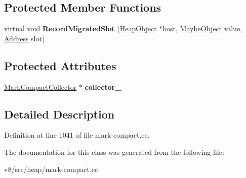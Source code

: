 \subsection*{Protected Member Functions}
\begin{DoxyCompactItemize}
\item 
\mbox{\label{classv8_1_1internal_1_1RecordMigratedSlotVisitor_a143c9723613d76908e2ac3d8e6bc746e}} 
virtual void {\bfseries Record\+Migrated\+Slot} (\mbox{\hyperlink{classv8_1_1internal_1_1HeapObject}{Heap\+Object}} $\ast$host, \mbox{\hyperlink{classv8_1_1internal_1_1MaybeObject}{Maybe\+Object}} value, \mbox{\hyperlink{classuintptr__t}{Address}} slot)
\end{DoxyCompactItemize}
\subsection*{Protected Attributes}
\begin{DoxyCompactItemize}
\item 
\mbox{\label{classv8_1_1internal_1_1RecordMigratedSlotVisitor_a459a48da514fc34c7fb5223d5da4018f}} 
\mbox{\hyperlink{classv8_1_1internal_1_1MarkCompactCollector}{Mark\+Compact\+Collector}} $\ast$ {\bfseries collector\+\_\+}
\end{DoxyCompactItemize}


\subsection{Detailed Description}


Definition at line 1041 of file mark-\/compact.\+cc.



The documentation for this class was generated from the following file\+:\begin{DoxyCompactItemize}
\item 
v8/src/heap/mark-\/compact.\+cc\end{DoxyCompactItemize}
